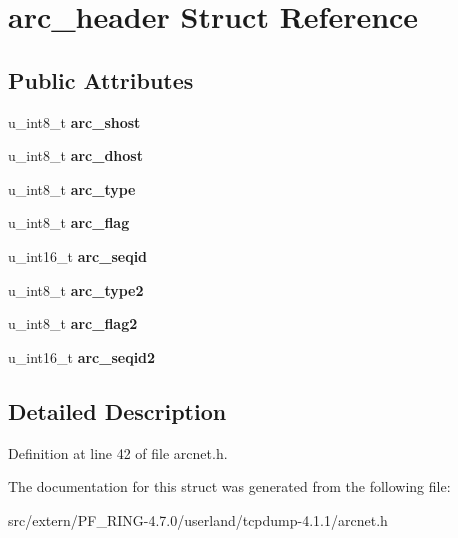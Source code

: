 \hypertarget{structarc__header}{
\section{arc\_\-header Struct Reference}
\label{structarc__header}
}
\subsection*{Public Attributes}
\begin{DoxyCompactItemize}
\item 
\hypertarget{structarc__header_ac8059c1b16c9ee55c38125d3db68f4dc}{
u\_\-int8\_\-t {\bfseries arc\_\-shost}}
\label{structarc__header_ac8059c1b16c9ee55c38125d3db68f4dc}

\item 
\hypertarget{structarc__header_ae2be7c7afcc14bf7f725fb74c02539d1}{
u\_\-int8\_\-t {\bfseries arc\_\-dhost}}
\label{structarc__header_ae2be7c7afcc14bf7f725fb74c02539d1}

\item 
\hypertarget{structarc__header_abb1451e73379243d4489a92c18954dd3}{
u\_\-int8\_\-t {\bfseries arc\_\-type}}
\label{structarc__header_abb1451e73379243d4489a92c18954dd3}

\item 
\hypertarget{structarc__header_a57d6fed827632761d5b69333774ef3fd}{
u\_\-int8\_\-t {\bfseries arc\_\-flag}}
\label{structarc__header_a57d6fed827632761d5b69333774ef3fd}

\item 
\hypertarget{structarc__header_a6468f03aa234348c5f9cb2ea1a4072fa}{
u\_\-int16\_\-t {\bfseries arc\_\-seqid}}
\label{structarc__header_a6468f03aa234348c5f9cb2ea1a4072fa}

\item 
\hypertarget{structarc__header_a1274696f9a75f180eb783f3e50f193c0}{
u\_\-int8\_\-t {\bfseries arc\_\-type2}}
\label{structarc__header_a1274696f9a75f180eb783f3e50f193c0}

\item 
\hypertarget{structarc__header_a9d75db5ee986cb9b45fec5f20c91997e}{
u\_\-int8\_\-t {\bfseries arc\_\-flag2}}
\label{structarc__header_a9d75db5ee986cb9b45fec5f20c91997e}

\item 
\hypertarget{structarc__header_a3b32cb484ea342e1891da7da7a936002}{
u\_\-int16\_\-t {\bfseries arc\_\-seqid2}}
\label{structarc__header_a3b32cb484ea342e1891da7da7a936002}

\end{DoxyCompactItemize}


\subsection{Detailed Description}


Definition at line 42 of file arcnet.h.



The documentation for this struct was generated from the following file:\begin{DoxyCompactItemize}
\item 
src/extern/PF\_\-RING-\/4.7.0/userland/tcpdump-\/4.1.1/arcnet.h\end{DoxyCompactItemize}
